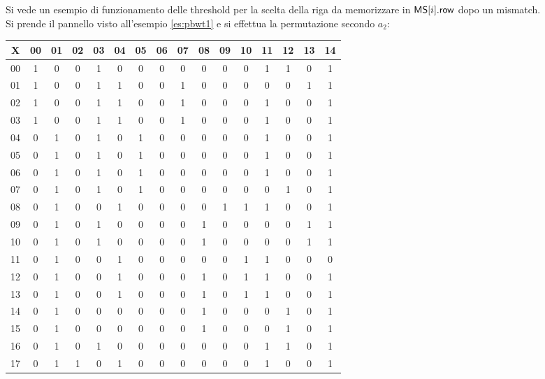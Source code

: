 \begin{esempio}
  \label{es:thr}
  Si vede un esempio di funzionamento delle threshold per la scelta
  della riga da memorizzare in $\mbox{\rm {\sf MS}}[i].\mbox{\rm {\sf row}}$ dopo un mismatch.\\
  Si prende il pannello visto all'esempio \ref{es:pbwt1} e si effettua la
  permutazione secondo $a_2$:
  \begin{table}[H]
    \centering
    \footnotesize
    \begin{tabular}{c|cc|c|cccccccccccc}
      X & 00 & 01 & 02 & 03 & 04 & 05 & 06 & 07 & 08 & 09 & 10 & 11 & 12 & 13
      & 14 \\
      \hline
      00 & 1 & 0 & 0 & 1 & 0 & 0 & 0 & 0 & 0 & 0 & 0 & 1 & 1 & 0 & 1 \\
      01 & 1 & 0 & 0 & 1 & 1 & 0 & 0 & 1 & 0 & 0 & 0 & 0 & 0 & 1 & 1 \\
      02 & 1 & 0 & 0 & 1 & 1 & 0 & 0 & 1 & 0 & 0 & 0 & 1 & 0 & 0 & 1 \\
      03 & 1 & 0 & 0 & 1 & 1 & 0 & 0 & 1 & 0 & 0 & 0 & 1 & 0 & 0 & 1 \\
      04 & 0 & 1 & 0 & 1 & 0 & 1 & 0 & 0 & 0 & 0 & 0 & 1 & 0 & 0 & 1 \\
      05 & 0 & 1 & 0 & 1 & 0 & 1 & 0 & 0 & 0 & 0 & 0 & 1 & 0 & 0 & 1 \\
      06 & 0 & 1 & 0 & 1 & 0 & 1 & 0 & 0 & 0 & 0 & 0 & 1 & 0 & 0 & 1 \\
      07 & 0 & 1 & 0 & 1 & 0 & 1 & 0 & 0 & 0 & 0 & 0 & 0 & 1 & 0 & 1 \\
      08 & 0 & 1 & 0 & 0 & 1 & 0 & 0 & 0 & 0 & 1 & 1 & 1 & 0 & 0 & 1 \\
      09 & 0 & 1 & 0 & 1 & 0 & 0 & 0 & 0 & 1 & 0 & 0 & 0 & 0 & 1 & 1 \\
      10 & 0 & 1 & 0 & 1 & 0 & 0 & 0 & 0 & 1 & 0 & 0 & 0 & 0 & 1 & 1 \\
      11 & 0 & 1 & 0 & 0 & 1 & 0 & 0 & 0 & 0 & 0 & 1 & 1 & 0 & 0 & 0 \\
      12 & 0 & 1 & 0 & 0 & 1 & 0 & 0 & 0 & 1 & 0 & 1 & 1 & 0 & 0 & 1 \\
      13 & 0 & 1 & 0 & 0 & 1 & 0 & 0 & 0 & 1 & 0 & 1 & 1 & 0 & 0 & 1 \\
      14 & 0 & 1 & 0 & 0 & 0 & 0 & 0 & 0 & 1 & 0 & 0 & 0 & 1 & 0 & 1 \\
      15 & 0 & 1 & 0 & 0 & 0 & 0 & 0 & 0 & 1 & 0 & 0 & 0 & 1 & 0 & 1 \\
      16 & 0 & 1 & 0 & 1 & 0 & 0 & 0 & 0 & 0 & 0 & 0 & 1 & 1 & 0 & 1 \\
      17 & 0 & 1 & 1 & 0 & 1 & 0 & 0 & 0 & 0 & 0 & 0 & 1 & 0 & 0 & 1 \\

\end{tabular}
\end{table}
\end{esempio}
